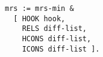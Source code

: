 \documentclass[a4paper]{article}
\begin{document}
{\small\begin{verbatim}
mrs := mrs-min &
  [ HOOK hook,
    RELS diff-list,
    HCONS diff-list,
    ICONS diff-list ].
\end{verbatim}}
\end{document}

